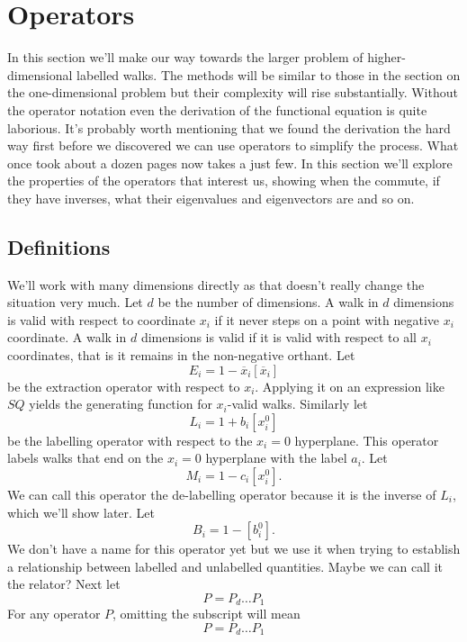 \documentclass[12pt]{article}
\theoremstyle{definition} \newtheorem{definition}[theorem]{Definition}
\newcommand{\ol}[1]{\overline{#1}}
\begin{document}
\section{Operators}

In this section we'll make our way towards the larger problem of higher-dimensional labelled walks. The methods will be similar to those in the section on the one-dimensional problem but their complexity will rise substantially. Without the operator notation even the derivation of the functional equation is quite laborious. It's probably worth mentioning that we found the derivation the hard way first before we discovered we can use operators to simplify the process. What once took about a dozen pages now takes a just few. In this section we'll explore the properties of the operators that interest us, showing when the commute, if they have inverses, what their eigenvalues and eigenvectors are and so on.

\subsection{Definitions}
We'll work with many dimensions directly as that doesn't really change the situation very much. Let $d$ be the number of dimensions. A walk in $d$ dimensions is valid with respect to coordinate $x_i$ if it never steps on a point with negative $x_i$ coordinate. A walk in $d$ dimensions is valid if it is valid with respect to all $x_i$ coordinates, that is it remains in the non-negative orthant. Let
\[
	E_i = 1 - \ol{x}_i[\ol{x}_i]
\]
be the extraction operator with respect to $x_i$. Applying it on an expression like $SQ$ yields the generating function for $x_i$-valid walks. Similarly let 
\[
	L_i = 1 + b_i [x_i^0]
\]
be the labelling operator with respect to the $x_i = 0$ hyperplane. This operator labels walks that end on the $x_i = 0$ hyperplane with the label $a_i$. Let
\[
	M_i = 1 - c_i[x_i^0].
\]
We can call this operator the de-labelling operator because it is the inverse of $L_i$, which we'll show later. Let
\[
	B_i = 1 - [b_i^0].
\]
We don't have a name for this operator yet but we use it when trying to establish a relationship between labelled and unlabelled quantities. Maybe we can call it the relator? Next let
\[
	P = P_d \ldots P_1
\]
For any operator $P$, omitting the subscript will mean
\[
	P = P_d\ldots P_1
\]
\end{document}
